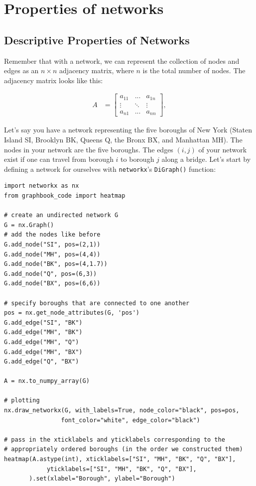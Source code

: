 \section{Properties of networks}
\label{sec:ch4:prop-net}


\subsection{Descriptive Properties of Networks}

Remember that with a network, we can represent the collection of nodes and edges as an $n \times n$ adjacency matrix, where $n$ is the total number of nodes. The adjacency matrix looks like this:

\begin{align*}
    A &= \begin{bmatrix}
        a_{11} & ... & a_{1n} \\
        \vdots & \ddots & \vdots \\
        a_{n1} & ... & a_{nn}
    \end{bmatrix},
\end{align*}

Let's say you have a network representing the five boroughs of New York (Staten Island SI, Brooklyn BK, Queens Q, the Bronx BX, and Manhattan MH). The nodes in your network are the five boroughs. The edges $(i,j)$ of your network exist if one can travel from borough $i$ to borough $j$ along a bridge. Let's start by defining a network for ourselves with \texttt{networkx}'s \texttt{DiGraph()} function:


\begin{lstlisting}[style=python]
import networkx as nx
from graphbook_code import heatmap

# create an undirected network G
G = nx.Graph()
# add the nodes like before
G.add_node("SI", pos=(2,1))
G.add_node("MH", pos=(4,4))
G.add_node("BK", pos=(4,1.7))
G.add_node("Q", pos=(6,3))
G.add_node("BX", pos=(6,6))

# specify boroughs that are connected to one another
pos = nx.get_node_attributes(G, 'pos')
G.add_edge("SI", "BK")
G.add_edge("MH", "BK")
G.add_edge("MH", "Q")
G.add_edge("MH", "BX")
G.add_edge("Q", "BX")

A = nx.to_numpy_array(G)

# plotting
nx.draw_networkx(G, with_labels=True, node_color="black", pos=pos,
                font_color="white", edge_color="black")

# pass in the xticklabels and yticklabels corresponding to the
# appropriately ordered boroughs (in the order we constructed them)
heatmap(A.astype(int), xticklabels=["SI", "MH", "BK", "Q", "BX"],
            yticklabels=["SI", "MH", "BK", "Q", "BX"], 
       ).set(xlabel="Borough", ylabel="Borough")
\end{lstlisting}


